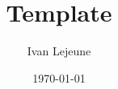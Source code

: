 


\usepackage[a4paper,hmargin=30mm,vmargin=30mm]{geometry}

\title{\color{astral} \sffamily \bfseries Template}
\author{Ivan Lejeune}
\date{\today}


    
    



